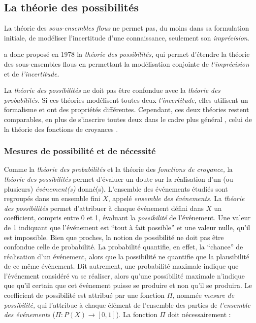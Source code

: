 

\subsection{La théorie des possibilités}

La théorie des \emph{sous-ensembles flous} ne permet pas, du moins
dans sa formulation initiale, de modéliser l'incertitude d'une
connaissance, seulement son \emph{imprécision.}

\textcite{Zadeh1978} a donc proposé en 1978 la \emph{théorie des
  possibilités,} qui permet d'étendre la théorie des sous-ensembles
flous en permettant la modélisation conjointe de \emph{l'imprécision}
et de \emph{l'incertitude.}

La \emph{théorie des possibilités} ne doit pas être confondue avec la
\emph{théorie des probabilités.} Si ces théories modélisent toutes
deux \emph{l'incertitude,} elles utilisent un formalisme et ont des
propriétés différentes. Cependant, ces deux théories restent
comparables, en plus de s’inscrire toutes deux dans le cadre plus
général \autocite{Bouchon-Meunier1995}, celui de la théorie des
fonctions de croyances \autocite{Shafer1976}.

\subsubsection{Mesures de possibilité et de nécessité}

Comme la \emph{théorie des probabilités} et la théorie des
\emph{fonctions de croyance,} la \emph{théorie des possibilités}
permet d'évaluer un doute sur la réalisation d'un (ou plusieurs)
\emph{événement(s)} donné(s). L'ensemble des événements étudiés sont
regroupés dans un ensemble fini \(X\), appelé \emph{ensemble des
  événements.} La \emph{théorie des possibilités} permet d'attribuer à
chaque événement défini dans \(X\) un coefficient, compris entre 0 et
1, évaluant la \emph{possibilité} de l'événement. Une valeur de 1
indiquant que l'événement est \enquote{tout à fait possible}
\autocite[p. 43]{Bouchon-Meunier2007} et une valeur nulle, qu'il est
impossible. Bien que proches, la notion de possibilité ne doit pas
être confondue celle de probabilité. La probabilité quantifie, en
effet, la \enquote{chance} de réalisation d'un événement, alors que la
possibilité ne quantifie que la plausibilité de ce même événement. Dit
autrement, une probabilité maximale indique que l'événement considéré
va se réaliser, alors qu'une possibilité maximale n'indique que qu'il
certain que cet événement puisse se produire et non qu'il se produira.
Le coefficient de possibilité est attribué par une fonction \(Π\),
nommée \emph{mesure de possibilité,} qui l'attribue à chaque élément
de l'ensemble des parties de \emph{l'ensemble des événements}
(\(Π : P(X) → [0,1]\)). La fonction \(Π\) doit nécessairement :

